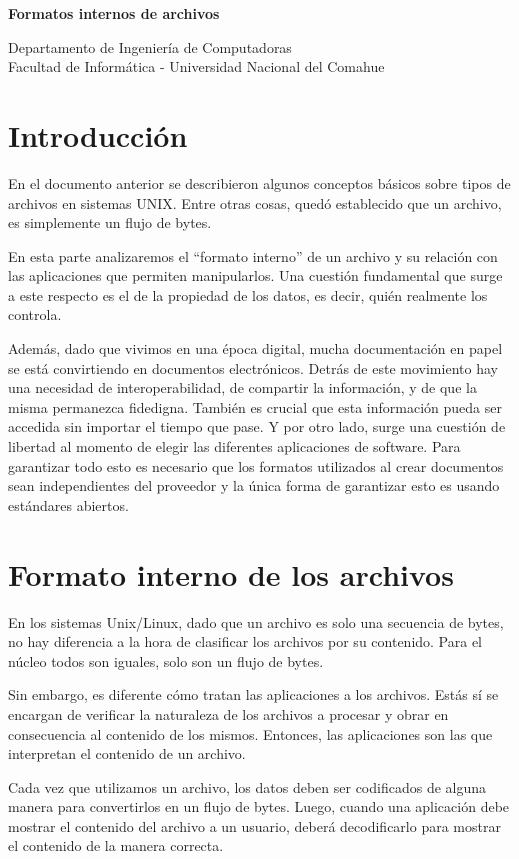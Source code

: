 \documentclass[12pt]{article}
\def\maketitle{

\makeatletter
{\color{bl} \centering \huge \sc \textbf{
Formatos internos de archivos\\
 \vspace*{8pt} }\par}
 \makeatother


 \makeatletter
 {\centering \small 
 	Departamento de Ingeniería de Computadoras \\
 	Facultad de Informática - Universidad Nacional del Comahue \\
 	\vspace{20pt} }
 \makeatother

}
\begin{document}
\thispagestyle{empty}
\maketitle
\setlength{\parindent}{0pt}


\section*{Introducción}
En el documento anterior se describieron algunos conceptos básicos sobre tipos de archivos en sistemas UNIX. Entre otras cosas, quedó establecido que un archivo, es simplemente un flujo de bytes.  

En esta parte analizaremos el ``formato interno'' de un archivo y su relación con las aplicaciones que permiten manipularlos. Una cuestión fundamental que surge a este respecto es el de la propiedad de los datos, es decir, quién realmente los controla. 

Además, dado que vivimos en una época digital, mucha documentación en papel se está convirtiendo en documentos electrónicos. Detrás de este movimiento hay una necesidad de interoperabilidad, de compartir la información, y de que la misma permanezca fidedigna. También es crucial que esta información pueda ser accedida sin importar el tiempo que pase. Y por otro lado, surge una cuestión de libertad al momento de elegir las diferentes aplicaciones de software. Para garantizar todo esto es necesario que los formatos utilizados al crear documentos sean independientes del proveedor y la única forma de garantizar esto es usando estándares abiertos. 

\section*{Formato interno de los archivos}

En los sistemas Unix/Linux, dado que un archivo es solo una secuencia de bytes, no hay diferencia a la hora de clasificar los archivos por su contenido. Para el núcleo todos son iguales, solo son un flujo de bytes. 

Sin embargo, es diferente cómo tratan las aplicaciones a los archivos. Estás sí se encargan de verificar la naturaleza de los archivos a procesar y obrar en consecuencia al contenido de los mismos. Entonces, las aplicaciones son las que interpretan el contenido de un archivo.

Cada vez que utilizamos un archivo, los datos deben ser codificados de alguna manera para convertirlos en un flujo de bytes. Luego, cuando una aplicación debe mostrar el contenido del archivo a un usuario, deberá decodificarlo para mostrar el contenido de la manera correcta.
\end{document}
